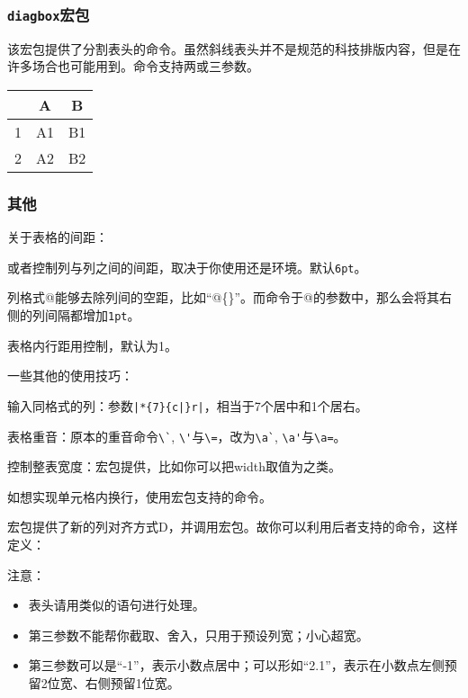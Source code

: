 \subsubsection{\texttt{diagbox}宏包}
该宏包提供了分割表头的命令。虽然斜线表头并不是规范的科技排版内容，但是在许多场合也可能用到。命令支持两或三参数。
\begin{codeshow}
\begin{tabular}{c|cc}
\diagbox{左边}{中间}{右边} & A & B \\
\hline
1 & A1 & B1 \\
2 & A2 & B2 
\end{tabular}
\end{codeshow}

\subsubsection{其他}
关于表格的间距：
\begin{feai}
\item {}或者控制列与列之间的间距，取决于你使用还是环境。默认\texttt{6pt}。
\item 列格式@能够去除列间的空距，比如“@\{\}”。而命令于@的参数中，那么会将其右侧的列间隔都增加\texttt{1pt}。
\item 表格内行距用控制，默认为1。
\end{feai}

一些其他的使用技巧：
\begin{feae}
\item 输入同格式的列：参数\verb+|*{7}{c|}r|+，相当于7个居中和1个居右。
\item 表格重音：原本的重音命令\verb|\`|, \verb|\'|与\verb|\=|，改为\verb|\a`|, \verb|\a'|与\verb|\a=|。
\item 控制整表宽度：宏包提供，比如你可以把width取值为之类。
\item 如想实现单元格内换行，使用宏包支持的命令。
\item 宏包提供了新的列对齐方式D，并调用宏包。故你可以利用后者支持的命令，这样定义：
注意：\begin{itemize}
\item 表头请用类似的语句进行处理。
\item 第三参数不能帮你截取、舍入，只用于预设列宽；小心超宽。
\item 第三参数可以是“-1”，表示小数点居中；可以形如“2.1”，表示在小数点左侧预留2位宽、右侧预留1位宽。
\end{itemize}
\end{feae}

